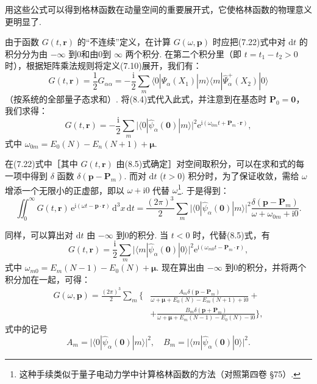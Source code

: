 用这些公式可以得到格林函数在动量空间的重要展开式，它使格林函数的物理意义更明显了.

由于函数 $G(t,\bm r)$ 的“不连续”定义，在计算 $G(\omega,\bm p)$ 时应把(7.22)式中对 $\mathrm{d}t$ 的积分分为由 $-\infty$ 到0和由0到 $\infty$ 两个积分. 在第二个积分里（即 $t=t_1-t_2>0$ 时），根据矩阵乘法规则将定义(7.10)展开，我们有：
\begin{equation*}
G(t,\bm r)=\frac{1}{2}G_{\alpha\alpha}=-\frac{\mathrm{i}}{2}\sum_m\langle0|\hat\Psi_\alpha(X_1)|m\rangle\langle m|\hat\Psi^{+}_\alpha(X_2)|0\rangle
\end{equation*}
（按系统的全部量子态求和）. 将(8.4)式代入此式，并注意到在基态时 $\bm P_0=\bm 0$，我们求得：
\begin{equation}
G(t,\bm r)=-\frac{\mathrm{i}}{2}\sum_m\big|\langle0|\hat\psi_\alpha(\bm 0)|m\rangle\big|^2\mathrm{e}^{\mathrm{i}(\omega_{0m}t+\bm P_m\cdot\bm r)},
\end{equation}
式中 $\omega_{0m}=E_0(N)-E_n(N+1)+\bm\mu$.

在(7.22)式中［其中 $G(t,\bm r)$ 由(8.5)式确定］对空间取积分，可以在求和式的每一项中得到 $\delta$ 函数 $\delta(\bm p-\bm P_m)$. 而对 $\mathrm{d}t$ ($t>0$) 积分时，为了保证收敛，需给 $\omega$ 增添一个无限小的正虚部，即以 $\omega+\mathrm{i}0$ 代替 $\omega$\footnote{这种手续类似于量子电动力学中计算格林函数的方法（对照第四卷 §75）.}. 于是得到：
\begin{equation*}
\iint_0^{\infty}G(t,\bm r)\,\mathrm{e}^{\mathrm{i}(\omega t-\bm p\cdot\bm r)}\,\mathrm{d}^3x\,\mathrm{d}t=\frac{(2\pi)^3}{2}\sum_m\big|\langle0|\hat\psi_\alpha(\bm 0)|m\rangle\big|^2\frac{\delta(\bm p-\bm P_m)}{\omega+\omega_{0m}+\mathrm{i}0}.
\end{equation*}

同样，可以算出对 $\mathrm{d}t$ 由 $-\infty$ 到0的积分. 当 $t<0$ 时，代替(8.5)式，有
\begin{equation}
G(t,\bm r)=\frac{\mathrm{i}}{2}\sum_m\big|\langle m|\hat\psi_\alpha(\bm 0)|0\rangle\big|^2\mathrm{e}^{\mathrm{i}(\omega_{m0}t-\bm P_m\cdot\bm r)},
\end{equation}
式中 $\omega_{m0}=E_m(N-1)-E_0(N)+\bm\mu$. 现在算出由 $-\infty$ 到0的积分，并将两个积分加在一起，可得：
\begin{equation}
\begin{aligned}
G(\omega,\bm p)=\frac{(2\pi)^3}{2}\sum_m\Big\{&\frac{A_m\delta(\bm p-\bm P_m)}{\omega+\bm\mu+E_0(N)-E_m(N+1)+\mathrm{i}0}+\\
&+\frac{B_m\delta(\bm p+\bm P_m)}{\omega+\bm\mu+E_m(N-1)-E_0(N)-\mathrm{i}0}\Big\},
\end{aligned}
\end{equation}
式中的记号
\begin{equation}
A_m=\big|\langle0|\hat\psi_\alpha(\bm 0)|m\rangle\big|^2,\quad B_m=\big|\langle m|\hat\psi_\alpha(\bm 0)|0\rangle\big|^2.
\end{equation}

